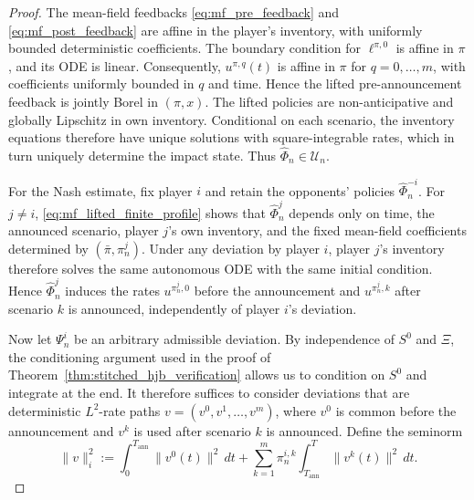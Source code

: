 \documentclass[12pt]{article}
\numberwithin{equation}{section}
\theoremstyle{definition}
\begin{document}
\begin{proof}
The mean-field feedbacks \eqref{eq:mf_pre_feedback} and
\eqref{eq:mf_post_feedback} are affine in the player's inventory, with
uniformly bounded deterministic coefficients. The boundary condition for
\(\ell^{\pi,0}\) is affine in \(\pi\), and its ODE is linear. Consequently,
\(u^{\pi,q}(t)\) is affine in \(\pi\) for \(q=0,\ldots,m\), with coefficients
uniformly bounded in \(q\) and time. Hence the lifted
pre-announcement feedback is jointly Borel in \((\pi,x)\). The lifted policies
are non-anticipative and globally Lipschitz in own inventory. Conditional on
each scenario, the inventory equations therefore have unique solutions with
square-integrable rates, which in turn uniquely determine the impact state.
Thus \(\widehat\Phi_n\in\mathcal U_n\).

For the Nash estimate, fix player \(i\) and retain the opponents' policies
\(\widehat\Phi_n^{-i}\). For \(j\ne i\),
\eqref{eq:mf_lifted_finite_profile} shows that \(\widehat\Phi_n^j\) depends only
on time, the announced scenario, player \(j\)'s own inventory, and the fixed
mean-field coefficients determined by \((\bar\pi,\pi_n^j)\). Under any deviation
by player \(i\), player \(j\)'s inventory therefore solves the same autonomous
ODE with the same initial condition. Hence \(\widehat\Phi_n^j\) induces the
rates \(u^{\pi_n^j,0}\) before the announcement and \(u^{\pi_n^j,k}\) after
scenario \(k\) is announced, independently of player \(i\)'s deviation.

Now let \(\Psi_n^i\) be an arbitrary admissible deviation. By independence of
\(S^0\) and \(\Xi\), the conditioning argument used in the proof of
Theorem~\ref{thm:stitched_hjb_verification} allows us to condition on \(S^0\)
and integrate at the end. It therefore suffices to consider deviations that are deterministic
\(L^2\)-rate paths \(v=(v^0,v^1,\ldots,v^m)\), where \(v^0\) is common before the
announcement and \(v^k\) is used after scenario \(k\) is announced. Define the seminorm
\[
\|v\|_i^2
:=
\int_0^{T_{\mathrm{ann}}}\|v^0(t)\|^2\,dt
+
\sum_{k=1}^m\pi_n^{i,k}
\int_{T_{\mathrm{ann}}}^T\|v^k(t)\|^2\,dt.
\]


\end{proof}
\end{document}
